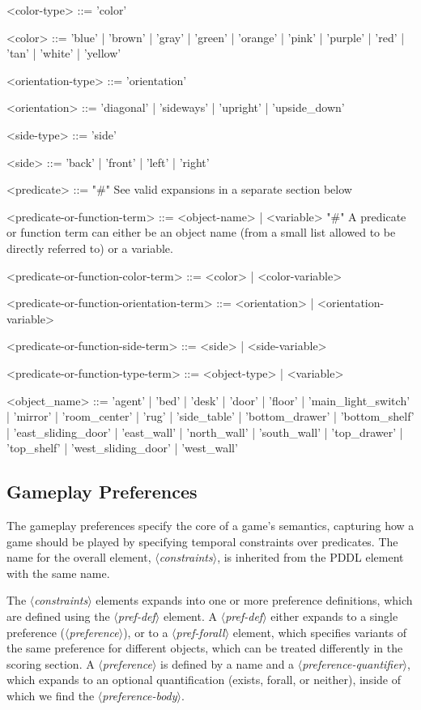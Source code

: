 \documentclass{article}
\newcommand{\dsl}[1]{{\it $\langle$#1$\rangle$}}
\begin{document}
\begin{grammar}
<color-type> ::= 'color'

<color> ::= 'blue' | 'brown' | 'gray' | 'green' | 'orange' | 'pink' | 'purple' | 'red' | 'tan' | 'white' | 'yellow'

<orientation-type> ::= 'orientation'

<orientation> ::= 'diagonal' | 'sideways' | 'upright' | 'upside\_down'

<side-type> ::= 'side'

<side> ::= 'back' | 'front' | 'left' | 'right'

<predicate> ::= "#" See valid expansions in a separate section below

<predicate-or-function-term> ::= <object-name> | <variable> "#" A predicate or function term can either be an object name (from a small list allowed to be directly referred to) or a variable.

<predicate-or-function-color-term> ::= <color> | <color-variable>

<predicate-or-function-orientation-term> ::= <orientation> | <orientation-variable>

<predicate-or-function-side-term> ::= <side> | <side-variable>

<predicate-or-function-type-term> ::= <object-type> | <variable>

<object_name> ::= 'agent' | 'bed' | 'desk' | 'door' | 'floor' | 'main\_light\_switch' | 'mirror' | 'room_center' | 'rug' | 'side\_table' | 'bottom\_drawer' | 'bottom\_shelf' | 'east\_sliding\_door' | 'east\_wall' | 'north\_wall' | 'south\_wall' | 'top\_drawer' | 'top\_shelf' | 'west\_sliding\_door' | 'west\_wall'



\end{grammar}



\subsection{Gameplay Preferences} \label{sec:constraints}
The gameplay preferences specify the core of a game's semantics, capturing how a game should be played by specifying temporal constraints over predicates.
The name for the overall element, \dsl{constraints}, is inherited from the PDDL element with the same name.

The \dsl{constraints} elements expands into one or more preference definitions, which are defined using the \dsl{pref-def} element.
A \dsl{pref-def} either expands to a single preference (\dsl{preference}), or to a \dsl{pref-forall} element, which specifies variants of the same preference for different objects, which can be treated differently in the scoring section.
A \dsl{preference} is defined by a name and a \dsl{preference-quantifier}, which expands to an optional quantification (exists, forall, or neither), inside of which we find the \dsl{preference-body}.
\end{document}
